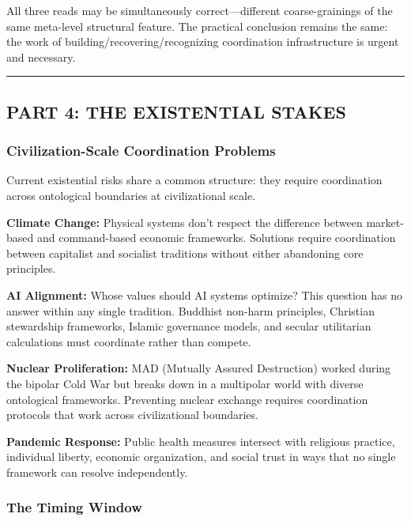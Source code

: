 \documentclass[
]{article}
\begin{document}
All three reads may be simultaneously correct---different
coarse-grainings of the same meta-level structural feature. The
practical conclusion remains the same: the work of
building/recovering/recognizing coordination infrastructure is urgent
and necessary.

\begin{center}\rule{0.5\linewidth}{0.5pt}\end{center}

\subsection{PART 4: THE EXISTENTIAL
STAKES}\label{part-4-the-existential-stakes}

\subsubsection{Civilization-Scale Coordination
Problems}\label{civilization-scale-coordination-problems}

Current existential risks share a common structure: they require
coordination across ontological boundaries at civilizational scale.

\textbf{Climate Change:} Physical systems don't respect the difference
between market-based and command-based economic frameworks. Solutions
require coordination between capitalist and socialist traditions without
either abandoning core principles.

\textbf{AI Alignment:} Whose values should AI systems optimize? This
question has no answer within any single tradition. Buddhist non-harm
principles, Christian stewardship frameworks, Islamic governance models,
and secular utilitarian calculations must coordinate rather than
compete.

\textbf{Nuclear Proliferation:} MAD (Mutually Assured Destruction)
worked during the bipolar Cold War but breaks down in a multipolar world
with diverse ontological frameworks. Preventing nuclear exchange
requires coordination protocols that work across civilizational
boundaries.

\textbf{Pandemic Response:} Public health measures intersect with
religious practice, individual liberty, economic organization, and
social trust in ways that no single framework can resolve independently.

\subsubsection{The Timing Window}\label{the-timing-window}
\end{document}
